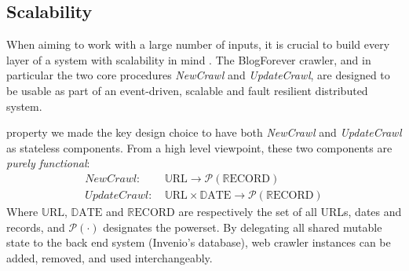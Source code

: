 \subsection{Scalability}
When aiming to work with a large number of inputs, it is crucial to build every layer of a system with scalability in mind \cite{thereactivemanifesto2013}. The BlogForever crawler, and in particular the two core procedures \emph{NewCrawl} and \emph{UpdateCrawl}, are designed to be usable as part of an event-driven, scalable and fault resilient distributed system.

 property we made the key design choice to have both \emph{NewCrawl} and \emph{UpdateCrawl} as stateless components. From a high level viewpoint, these two components are \emph{purely functional}:
%
\newcommand\URL{\mathbb{U}\text{RL}}
\newcommand\DATE{\mathbb{D}\text{ATE}}
\newcommand\RECORD{\mathbb{R}\text{ECORD}}
\begin{equation*}
  \begin{split}
    NewCrawl:    &~ \URL \rightarrow \mathcal{P}(\RECORD)\\
    UpdateCrawl: &~ \URL \times \DATE \rightarrow \mathcal{P}(\RECORD)
  \end{split}
\end{equation*}
Where $\URL$, $\DATE$ and $\RECORD$ are respectively the set of all URLs, dates and records, and $\mathcal{P}(\cdot)$ designates the powerset. By delegating all shared mutable state to the back end system (Invenio's database), web crawler instances can be added, removed, and used interchangeably.
